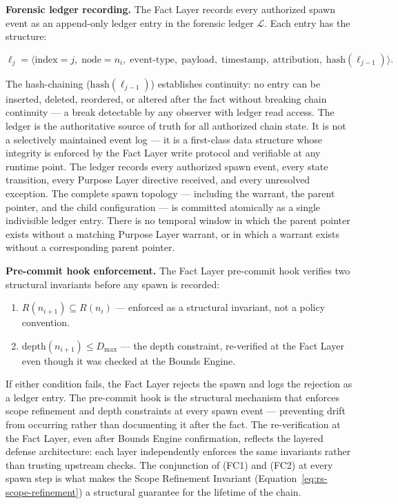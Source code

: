 \medskip
\noindent\textbf{Forensic ledger recording.} The Fact Layer records every authorized spawn event as an append-only ledger entry in the forensic ledger $\mathcal{L}$. Each entry has the structure:

\begin{equation}
\ell_j = \bigl\langle
\text{index}=j,\;
\text{node}=n_i,\;
\text{event-type},\;
\text{payload},\;
\text{timestamp},\;
\text{attribution},\;
\text{hash}(\ell_{j-1})
\bigr\rangle .
\label{eq:ledger-entry}
\end{equation}

The hash-chaining ($\text{hash}(\ell_{j-1})$) establishes continuity: no entry can be inserted, deleted, reordered, or altered after the fact without breaking chain continuity — a break detectable by any observer with ledger read access. The ledger is the authoritative source of truth for all authorized chain state. It is not a selectively maintained event log — it is a first-class data structure whose integrity is enforced by the Fact Layer write protocol and verifiable at any runtime point. The ledger records every authorized spawn event, every state transition, every Purpose Layer directive received, and every unresolved exception. The complete spawn topology — including the warrant, the parent pointer, and the child configuration — is committed atomically as a single indivisible ledger entry. There is no temporal window in which the parent pointer exists without a matching Purpose Layer warrant, or in which a warrant exists without a corresponding parent pointer.

\medskip
\noindent\textbf{Pre-commit hook enforcement.} The Fact Layer pre-commit hook verifies two structural invariants before any spawn is recorded:

\begin{enumerate}
    \item[(FC1)] $R(n_{i+1}) \subseteq R(n_i)$ — enforced as a structural invariant, not a policy convention.
    \item[(FC2)] $\text{depth}(n_{i+1}) \leq D_{\max}$ — the depth constraint, re-verified at the Fact Layer even though it was checked at the Bounds Engine.
\end{enumerate}

If either condition fails, the Fact Layer rejects the spawn and logs the rejection as a ledger entry. The pre-commit hook is the structural mechanism that enforces scope refinement and depth constraints at every spawn event — preventing drift from occurring rather than documenting it after the fact. The re-verification at the Fact Layer, even after Bounds Engine confirmation, reflects the layered defense architecture: each layer independently enforces the same invariants rather than trusting upstream checks. The conjunction of (FC1) and (FC2) at every spawn step is what makes the Scope Refinement Invariant (Equation~\ref{eq:rs-scope-refinement}) a structural guarantee for the lifetime of the chain.


